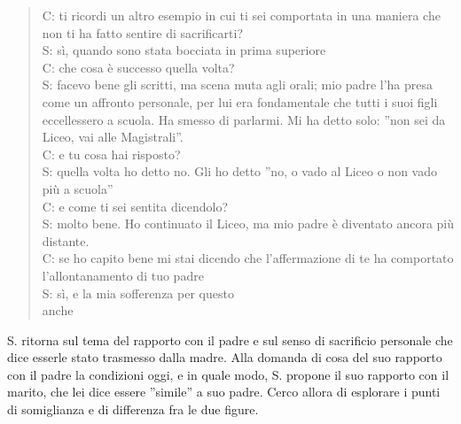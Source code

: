 \begin{verse}
C: ti ricordi un altro esempio in cui ti sei comportata in una maniera che non ti ha fatto sentire di sacrificarti?\\
S: sì, quando sono stata bocciata in prima superiore\\
C: che cosa è successo quella volta?\\
S: facevo bene gli scritti, ma scena muta agli orali; mio padre l'ha presa come un affronto personale, per lui era fondamentale che tutti i suoi figli eccellessero a scuola. Ha smesso di parlarmi. Mi ha detto solo: ''non sei da Liceo, vai alle Magistrali''.\\
C: e tu cosa hai risposto?\\
S: quella volta ho detto no. Gli ho detto ''no, o vado al Liceo o non vado più a scuola''\\
C: e come ti sei sentita dicendolo?\\
S: molto bene. Ho continuato il Liceo, ma mio padre è diventato ancora più distante.\\
C: se ho capito bene mi stai dicendo che l'affermazione di te ha comportato l'allontanamento di tuo padre\\
S: sì, e la mia sofferenza per questo\\anche
\end{verse}

\noindent S. ritorna sul tema del rapporto con il padre e sul senso di sacrificio personale che dice esserle stato trasmesso dalla madre. Alla domanda di cosa del suo rapporto con il padre la condizioni oggi, e in quale modo, S. propone il suo rapporto con il marito, che lei dice essere ''simile'' a suo padre. Cerco allora di esplorare i punti di somiglianza e di differenza fra le due figure.

